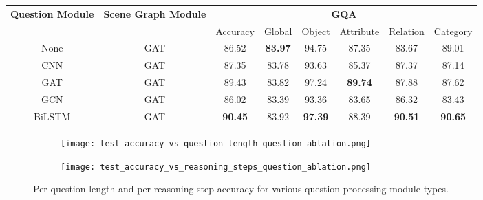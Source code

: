 \begin{table}[htbp]
\centering
\begin{footnotesize}
\begin{tabular}{cc|c|ccccc}
\toprule
\multirow{3}{0.1\textwidth}{\textbf{Question Module}} & \multirow{3}{0.1\textwidth}{\textbf{Scene Graph Module}} & \multicolumn{6}{c}{\multirow{2}{*}{\textbf{GQA}}}                                                   \\
                                          &                                              & \multicolumn{6}{c}{}                                                                                \\ \cmidrule(l){3-8} 
                                          &                                              & Accuracy       & Global         & Object         & Attribute      & Relation       & Category       \\ \midrule
None                                      & GAT                                          & 86.52          & \textbf{83.97}          & 94.75          & 87.35          & 83.67          & 89.01          \\
CNN                                       & GAT                                          & 87.35          & 83.78          & 93.63          & 85.37          & 87.37          & 87.14          \\
GAT                                       & GAT                                          & 89.43          & 83.82          & 97.24          & \textbf{89.74} & 87.88          & 87.62          \\
GCN                                       & GAT                                          & 86.02          & 83.39          & 93.36          & 83.65          & 86.32          & 83.43          \\
BiLSTM                                    & GAT                                          & \textbf{90.45} & 83.92          & \textbf{97.39} & 88.39          & \textbf{90.51} & \textbf{90.65} \\ \bottomrule
\end{tabular}
\end{footnotesize}
\end{table}

\begin{figure}[htbp]
    \centering
    \begin{subfigure}[l]{0.5\textwidth}
        \texttt{[image: test\_accuracy\_vs\_question\_length\_question\_ablation.png]}
        \label{fig:test_accuracy_vs_question_length_question_ablation}
    \end{subfigure}
    \begin{subfigure}[r]{0.49\textwidth}
        \texttt{[image: test\_accuracy\_vs\_reasoning\_steps\_question\_ablation.png]}
        \label{fig:test_accuracy_vs_reasoning_steps_question_ablation}
    \end{subfigure}
    \caption{Per-question-length and per-reasoning-step accuracy for various question processing module types.}
\end{figure}

